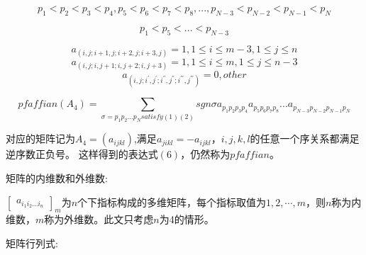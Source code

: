 \documentclass{amsc}          %
\numberwithin{equation}{section} %
\begin{document}
    \begin{equation}\label{a}p_{1}<p_{2}<p_{3}<p_{4},p_{5}<p_{6}<p_{7}<p_{8}
   ,...,p_{N-3}<p_{N-2}<p_{N-1}<p_{N}\end{equation}

   \begin{equation}\label{b}p_{1}<p_{5}<...<p_{N-3}\end{equation}

   \begin{equation}a_{(i,j;i+1,j;i+2,j;i+3,j)}=1,1\leq i \leq m-3,1\leq j\leq n\end{equation}
   \begin{equation}a_{(i,j;i,j+1;i,j+2;i,j+3)}=1,1\leq i \leq m,1\leq j\leq n-3\end{equation}
   \begin{equation}a_{(i,j;i^{'},j^{'};i^{''},j^{''};i^{'''},j^{'''})}=0,other \end{equation}

   \begin{equation}pfaffian(A_{4})=\sum\limits_{\sigma=p_{1}p_{2}...p_{N}satisfy(1)(2)}sgn\sigma a_{p_{1}p_{2}p_{3}p_{4}}a_{p_{5}p_{6}p_{7}p_{8}}...a_{p_{N-3}p_{N-2}p_{N-1}p_{N}}\end{equation}

   对应的矩阵记为$A_{4}=(a_{ijkl})$,满足$a_{jikl}=-a_{ijkl}$，$i,j,k,l$的任意一个序关系都满足逆序数正负号。
   这样得到的表达式$(6)$，仍然称为$pfaffian$。



\begin{definition} 矩阵的内维数和外维数:

$\begin{bmatrix}
a_{i_{1}i_{2}...i_{n}}\end{bmatrix}_{m}$为$n$个下指标构成的多维矩阵，每个指标取值为$1,2,\cdots,m$，则$n$称为内维数，$m$称为外维数。此文只考虑$n$为4的情形。
\end{definition}

\begin{definition} 矩阵行列式:
\end{definition}
\end{document}
